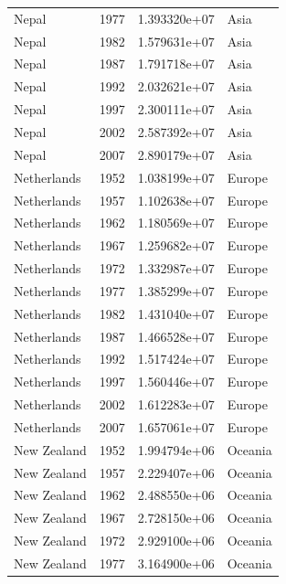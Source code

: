 \documentclass[
  letterpaper,
  DIV=11,
  numbers=noendperiod]{scrreprt}
\begin{document}
\begin{tcolorbox}
\begin{tabular}{lrrl}
Nepal                    &  1977 &  1.393320e+07 &      Asia \\
Nepal                    &  1982 &  1.579631e+07 &      Asia \\
Nepal                    &  1987 &  1.791718e+07 &      Asia \\
Nepal                    &  1992 &  2.032621e+07 &      Asia \\
Nepal                    &  1997 &  2.300111e+07 &      Asia \\
Nepal                    &  2002 &  2.587392e+07 &      Asia \\
Nepal                    &  2007 &  2.890179e+07 &      Asia \\
Netherlands              &  1952 &  1.038199e+07 &    Europe \\
Netherlands              &  1957 &  1.102638e+07 &    Europe \\
Netherlands              &  1962 &  1.180569e+07 &    Europe \\
Netherlands              &  1967 &  1.259682e+07 &    Europe \\
Netherlands              &  1972 &  1.332987e+07 &    Europe \\
Netherlands              &  1977 &  1.385299e+07 &    Europe \\
Netherlands              &  1982 &  1.431040e+07 &    Europe \\
Netherlands              &  1987 &  1.466528e+07 &    Europe \\
Netherlands              &  1992 &  1.517424e+07 &    Europe \\
Netherlands              &  1997 &  1.560446e+07 &    Europe \\
Netherlands              &  2002 &  1.612283e+07 &    Europe \\
Netherlands              &  2007 &  1.657061e+07 &    Europe \\
New Zealand              &  1952 &  1.994794e+06 &   Oceania \\
New Zealand              &  1957 &  2.229407e+06 &   Oceania \\
New Zealand              &  1962 &  2.488550e+06 &   Oceania \\
New Zealand              &  1967 &  2.728150e+06 &   Oceania \\
New Zealand              &  1972 &  2.929100e+06 &   Oceania \\
New Zealand              &  1977 &  3.164900e+06 &   Oceania \\

\end{tabular}
\end{tcolorbox}
\end{document}

